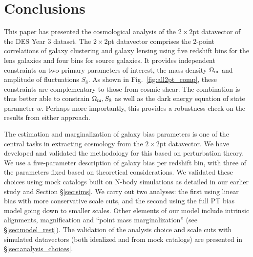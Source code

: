 \documentclass[aps, prd,twocolumn,superscriptaddress,nofootinbib,preprintnumbers]{revtex4-1}
\begin{document}


\section{Conclusions}
\label{sec:conclusions}
This paper has presented the cosmological analysis of the $2\times2$pt datavector of the DES Year 3 dataset. The $2\times2$pt datavector comprises the 2-point correlations of galaxy clustering and galaxy lensing using five redshift bins for the lens galaxies and four bins for source galaxies. It provides independent constraints on two primary parameters of interest, the mass density $\Omega_{\rm m}$ and amplitude of fluctuations $S_8$. As shown in Fig.~\ref{fig:all2pt_comp}, these constraints are complementary to those from cosmic shear. The combination is thus better able to constrain $\Omega_{\rm m}, S_8$ as well as the dark energy equation of state parameter $w$. Perhaps more importantly, this provides a robustness check on the results from either approach. 

The estimation and marginalization of galaxy bias parameters is one of the central tasks in extracting cosmology from the $2\times2$pt datavector. We have developed and validated the methodology for this based on perturbation theory. We use a five-parameter description of galaxy bias per redshift bin, with three of the parameters fixed based on theoretical considerations. We validated these choices using mock catalogs built on N-body simulations as detailed in our earlier study \citep{p2020perturbation} and Section \S\ref{sec:sims}.  
We carry out two analyses: the first using linear bias with more conservative scale cuts, and the second using the full PT bias model going down to smaller scales. Other  elements of our model include intrinsic alignments, magnification and ``point mass marginalization'' (see \S\ref{sec:model_rest}). The validation of the analysis choice and scale cuts with simulated datavectors (both idealized and from mock catalogs) are presented in \S\ref{sec:analysis_choices}. 
\end{document}
